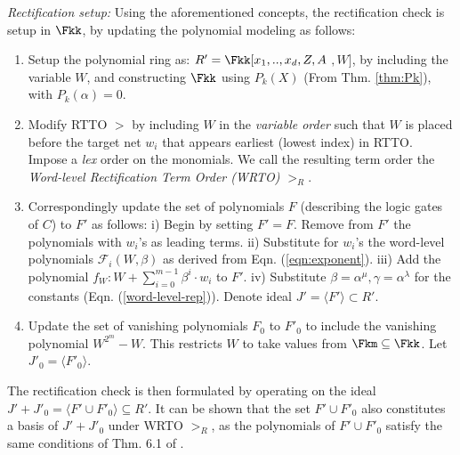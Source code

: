 {\it Rectification setup:} Using the aforementioned concepts, the
rectification check is setup in $\Fkk$, by updating the polynomial modeling as follows: 

\begin{enumerate}
\item Setup the polynomial ring as: $R'=\Fkk[x_1,..,x_d,Z,A$ $,W]$,
  by including the variable $W$, and constructing $\Fkk$ using $P_k(X)$
  (From Thm. \ref{thm:Pk}), with $P_k(\alpha)=0$. 
\item 
  Modify RTTO $>$ by including $W$ in the
  {\it variable order} such that $W$ is placed before the target net
  $w_i$ that appears earliest (lowest index) in RTTO. Impose a {\it
    lex} order on the monomials. We call the resulting 
  term order the {\it Word-level Rectification Term Order (WRTO)} $>_R$. 
\item Correspondingly update the set of polynomials $F$ (describing the
  logic gates of $C$) to $F'$ as follows: i) Begin by setting
  $F'=F$. Remove from $F'$ the polynomials with $w_i$'s as leading
  terms.
  ii) Substitute for $w_i$'s the word-level polynomials
  $\mathcal{F}_i(W,\beta)$ as  derived from
  Eqn. (\ref{eqn:exponent}). iii) Add the polynomial $f_W: W +
  \sum_{i=0}^{m-1}\beta^{i} \cdot w_i$ to $F'$. iv) Substitute 
  $\beta = \alpha^{\mu}, \gamma=\alpha^{\lambda}$ for the constants
  (Eqn. (\ref{word-level-rep})). Denote ideal $J'=\langle F'\rangle
  \subset R'$.
\item Update the set of vanishing polynomials $F_0$ to $F'_0$ to
  include the vanishing polynomial $W^{2^m}-W$. This restricts $W$ to
  take values from $\Fkm\subseteq\Fkk$. Let $J'_0=\langle F'_0\rangle$.
\end{enumerate}

The rectification check is then formulated by operating on the
ideal $J'+J'_0=\langle F' \cup F'_0\rangle \subseteq R'$. It can be
shown that the set $F'\cup F'_0$ also constitutes a \Grobner basis of
$J'+J'_0$ under WRTO $>_R$, as the polynomials of $F'\cup F'_0$
satisfy the same conditions of Thm. 6.1 of \cite{lv:tcad2013}.

